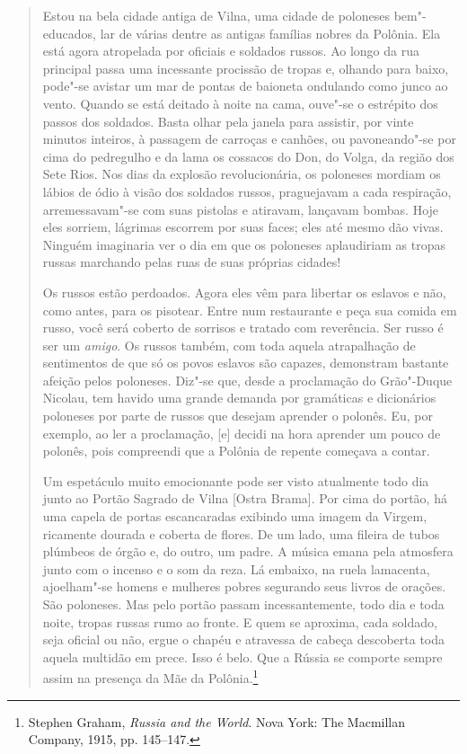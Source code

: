 \begin{quote}
Estou na bela cidade antiga de Vilna, uma cidade de poloneses
bem"-educados, lar de várias dentre as antigas famílias nobres da
Polônia. Ela está agora atropelada por oficiais e soldados russos. Ao
longo da rua principal passa uma incessante procissão de tropas e,
olhando para baixo, pode"-se avistar um mar de pontas de baioneta
ondulando como junco ao vento. Quando se está deitado à noite na cama,
ouve"-se o estrépito dos passos dos soldados. Basta olhar pela janela
para assistir, por vinte minutos inteiros, à passagem de carroças e
canhões, ou pavoneando"-se por cima do pedregulho e da lama os cossacos
do Don, do Volga, da região dos Sete Rios. Nos dias da explosão
revolucionária, os poloneses mordiam os lábios de ódio à visão dos
soldados russos, praguejavam a cada respiração, arremessavam"-se com suas
pistolas e atiravam, lançavam bombas. Hoje eles sorriem, lágrimas
escorrem por suas faces; eles até mesmo dão vivas. Ninguém imaginaria
ver o dia em que os poloneses aplaudiriam as tropas russas marchando
pelas ruas de suas próprias cidades!

Os russos estão perdoados. Agora eles vêm para libertar os eslavos e
não, como antes, para os pisotear. Entre num restaurante e peça sua
comida em russo, você será coberto de sorrisos e tratado com reverência.
Ser russo é ser um \textit{amigo}. Os russos também, com toda aquela
atrapalhação de sentimentos de que só os povos eslavos são capazes,
demonstram bastante afeição pelos poloneses. Diz"-se que, desde a
proclamação do Grão"-Duque Nicolau, tem havido uma grande demanda por
gramáticas e dicionários poloneses por parte de russos que desejam
aprender o polonês. Eu, por exemplo, ao ler a proclamação, {[}e{]}
decidi na hora aprender um pouco de polonês, pois compreendi que a
Polônia de repente começava a contar.

Um espetáculo muito emocionante pode ser visto atualmente todo dia junto
ao Portão Sagrado de Vilna {[}Ostra Brama{]}. Por cima do portão, há uma
capela de portas escancaradas exibindo uma imagem da Virgem, ricamente
dourada e coberta de flores. De um lado, uma fileira de tubos plúmbeos
de órgão e, do outro, um padre. A música emana pela atmosfera junto com
o incenso e o som da reza. Lá embaixo, na ruela lamacenta, ajoelham"-se
homens e mulheres pobres segurando seus livros de orações. São
poloneses. Mas pelo portão passam incessantemente, todo dia e toda
noite, tropas russas rumo ao fronte. E quem se aproxima, cada soldado,
seja oficial ou não, ergue o chapéu e atravessa de cabeça descoberta
toda aquela multidão em prece. Isso é belo. Que a Rússia se comporte
sempre assim na presença da Mãe da Polônia.\footnote{Stephen Graham, \textit{Russia and the World}. Nova York: The Macmillan Company, 1915, pp. 145--147.} 
\end{quote}

